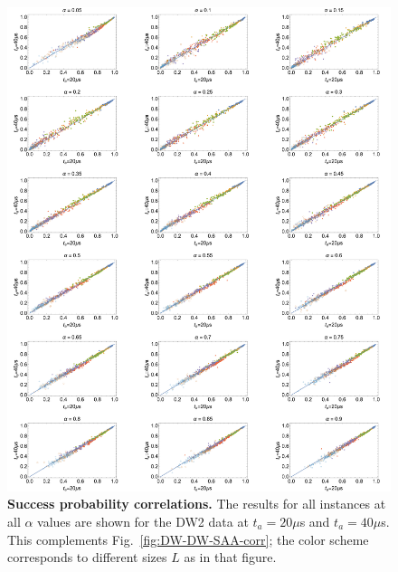 \begin{figure}
\begin{center}
\includegraphics[width=\textwidth]{chapters/Planted/corrDWvsDWgrid.pdf}
\caption{\textbf{Success probability correlations.} The results for all instances at all $\alpha$ values are shown for the DW2 data at $t_a=20\mu$s and $t_a=40\mu$s. This complements Fig.~\ref{fig:DW-DW-SAA-corr}; the color scheme corresponds to different sizes $L$ as in that figure.}
\label{fig:corr-DWvsDW-all-alphas}
\end{center}
\end{figure}


